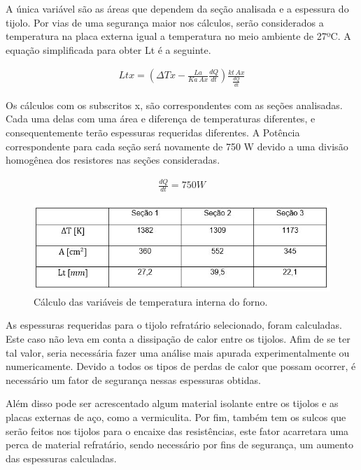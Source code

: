  A única variável são as áreas que dependem da seção analisada e a espessura do tijolo. Por vias de uma segurança maior nos cálculos, serão considerados a temperatura na placa externa igual a temperatura no meio ambiente de 27ºC. A equação simplificada para obter Lt é a seguinte.

\begin{align}
    Ltx = (\Delta Tx - \frac{La}{Ka\, Ax} \frac{dQ}{dt}) \frac{kt\, Ax}{\frac{dQ}{dt}}
\end{align}

Os cálculos com os subscritos x, são correspondentes com as seções analisadas. Cada uma delas com uma área e diferença de temperaturas diferentes, e consequentemente terão espessuras requeridas diferentes. A Potência correspondente para cada seção será novamente de 750 W devido a uma divisão homogênea dos resistores nas seções consideradas.

\begin{align}
	\frac{dQ}{dt} = 750W
\end{align}

\begin{figure}[!ht]
	\centering
	\label{tab}
	\includegraphics[keepaspectratio=true,scale=1.0]{figuras/tab.JPG}
	\caption{Cálculo das variáveis de temperatura interna do forno.}
\end{figure}

As espessuras requeridas para o tijolo refratário selecionado, foram calculadas. Este caso não leva em conta a dissipação de calor entre os tijolos. Afim de se ter tal valor, seria necessária fazer uma análise mais apurada experimentalmente ou numericamente.
Devido a todos os tipos de perdas de calor que possam ocorrer, é necessário um fator de segurança nessas espessuras obtidas.

Além disso pode ser acrescentado algum material isolante entre os tijolos e as placas externas de aço, como a vermiculita.
Por fim, também tem os sulcos que serão feitos nos tijolos para o encaixe das resistências, este fator acarretara uma perca de material refratário, sendo necessário por fins de segurança, um aumento das espessuras calculadas.

